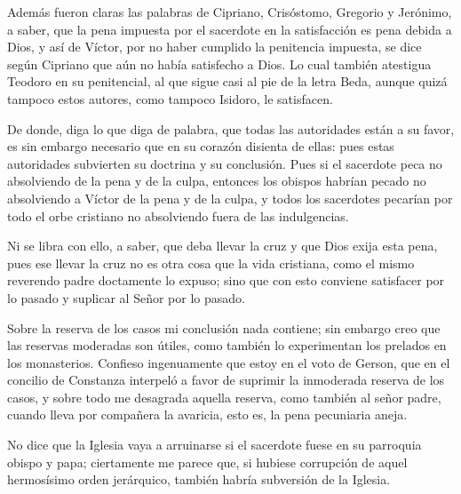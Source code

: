 \marginpar{\small[381]} Además fueron claras las palabras de Cipriano, Crisóstomo, Gregorio y Jerónimo, a saber, que la pena impuesta por el sacerdote en la satisfacción es pena debida a Dios, y así de Víctor, por no haber cumplido la penitencia impuesta, se dice según Cipriano que aún no había satisfecho a Dios. Lo cual también atestigua Teodoro en su penitencial, al que sigue casi al pie de la letra Beda, aunque quizá tampoco estos autores, como tampoco Isidoro, le satisfacen.

De donde, diga lo que diga de palabra, que todas las autoridades están a su favor, es sin embargo necesario que en su corazón disienta de ellas: pues estas autoridades subvierten su doctrina y su conclusión. Pues si el sacerdote peca no absolviendo de la pena y de la culpa, entonces los obispos habrían pecado no absolviendo a Víctor de la pena y de la culpa, y todos los sacerdotes pecarían por todo el orbe cristiano no absolviendo fuera de las indulgencias.

Ni se libra con ello, a saber, que deba llevar la cruz y que Dios exija esta pena, pues ese llevar la cruz no es otra cosa que la vida cristiana, como el mismo reverendo padre doctamente lo expuso; sino que con esto conviene satisfacer por lo pasado y suplicar al Señor por lo pasado.

Sobre la reserva de los casos mi conclusión nada contiene; sin embargo creo que las reservas moderadas son útiles, como también lo experimentan los prelados en los monasterios. Confieso ingenuamente que estoy en el voto de Gerson, que en el concilio de Constanza interpeló a favor de suprimir la inmoderada reserva de los casos, y sobre todo me desagrada aquella reserva, como también al señor padre, cuando lleva por compañera la avaricia, esto es, la pena pecuniaria aneja.

No dice que la Iglesia vaya a arruinarse si el sacerdote fuese en su parroquia obispo y papa; ciertamente me parece que, si hubiese corrupción de aquel hermosísimo orden jerárquico, también habría subversión de la Iglesia.

